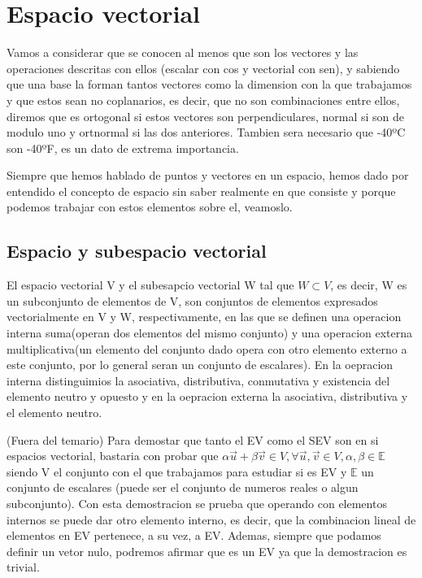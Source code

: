 \documentclass[11pt,a4paper]{article}
\begin{document}
\section{Espacio vectorial}

Vamos a considerar que se conocen al menos que son los vectores y las operaciones descritas con ellos (escalar con cos y vectorial con sen), y sabiendo que una base la forman tantos vectores como la dimension con la que trabajamos y que estos sean no coplanarios, es decir, que no son combinaciones entre ellos, diremos que es ortogonal si estos vectores son perpendiculares, normal si son de modulo uno y ortnormal si las dos anteriores. Tambien sera necesario que -40ºC son -40ºF, es un dato de extrema importancia.

Siempre que hemos hablado de puntos y vectores en un espacio, hemos dado por entendido el concepto de espacio sin saber realmente en que consiste y porque podemos trabajar con estos elementos sobre el, veamoslo.

\subsection{Espacio y subespacio vectorial}

El espacio vectorial V y el subesapcio vectorial W tal que $W\subset V$, es decir, W es un subconjunto de elementos de V, son conjuntos de elementos expresados vectorialmente en V y W, respectivamente, en las que se definen una operacion interna suma(operan dos elementos del mismo conjunto) y una operacion externa multiplicativa(un elemento del conjunto dado opera con otro elemento externo a este conjunto, por lo general seran un conjunto de escalares). En la oepracion interna distinguimios la asociativa, distributiva, conmutativa y existencia del elemento neutro y opuesto y en la oepracion externa la asociativa, distributiva y el elemento neutro. 

(Fuera del temario) Para demostar que tanto el EV como el SEV son en si espacios vectorial, bastaria con probar que $\alpha \vec{u}+\beta \vec{v}\in V, \forall \vec{u},\vec{v}\in V, \alpha ,\beta \in \mathbb{E}$ siendo V el conjunto con el que trabajamos para estudiar si es EV y $\mathbb{E}$ un conjunto de escalares (puede ser el conjunto de numeros reales o algun subconjunto). Con esta demostracion se prueba que operando con elementos internos se puede dar otro elemento interno, es decir, que la combinacion lineal de elementos en EV pertenece, a su vez, a EV. Ademas, siempre que podamos definir un vetor nulo, podremos afirmar que es un EV ya que la demostracion es trivial.
\end{document}

